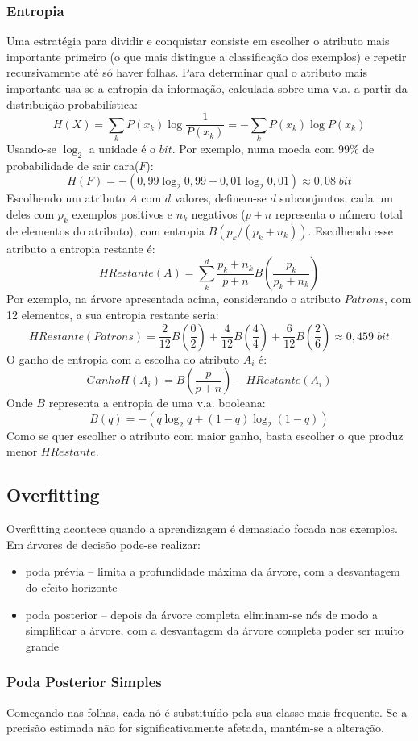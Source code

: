 \documentclass[10pt,a4paper]{report}
\begin{document}
\subsubsection{Entropia}
Uma estratégia para dividir e conquistar consiste em escolher o atributo mais importante primeiro (o que mais distingue a classificação dos exemplos) e repetir recursivamente até só haver folhas. Para determinar qual o atributo mais importante usa-se a entropia da informação, calculada sobre uma v.a. a partir da distribuição probabilística:
$$
H(X) = \sum_k P(x_k) \log \frac{1}{P(x_k)} = -\sum_k P(x_k) \log P(x_k)
$$
Usando-se $\log_2$ a unidade é o $bit$. Por exemplo, numa moeda com 99\% de probabilidade de sair cara($F$):
$$
H(F) = -(0,99\log_2 0,99 + 0,01 \log_2 0,01) \approx 0,08 \; bit
$$
Escolhendo um atributo $A$ com $d$ valores, definem-se $d$ subconjuntos, cada um deles com $p_k$ exemplos positivos e $n_k$ negativos ($p+n$ representa o número total de elementos do atributo), com entropia $B(p_k/(p_k+n_k))$. Escolhendo esse atributo a entropia restante é:
$$
HRestante(A) = \sum_k^d \frac{p_k + n_k}{p + n}B\left(\frac{p_k}{p_k+n_k}\right)
$$
Por exemplo, na árvore apresentada acima, considerando o atributo $Patrons$, com 12 elementos, a sua entropia restante seria:
$$
HRestante (Patrons) = \frac{2}{12} B\left(\frac{0}{2}\right) + \frac{4}{12} B\left(\frac{4}{4}\right) + \frac{6}{12} B\left(\frac{2}{6}\right) \approx 0,459 \; bit
$$
O ganho de entropia com a escolha do atributo $A_i$ é:
$$
GanhoH(A_i) = B \left(\frac{p}{p + n}\right) - HRestante(A_i)
$$
Onde $B$ representa a entropia de uma v.a. booleana: 
$$
B(q) = -(q\log_2 q+(1-q)\log_2 (1-q))
$$
Como se quer escolher o atributo com maior ganho, basta escolher o que produz menor $HRestante$.
\subsection{Overfitting}
Overfitting acontece quando a aprendizagem é demasiado focada nos exemplos. Em árvores de decisão pode-se realizar:
\begin{itemize}
\item poda prévia – limita a profundidade máxima da árvore, com a desvantagem do efeito horizonte
\item poda posterior – depois da árvore completa eliminam-se nós de modo a simplificar a árvore, com a desvantagem da árvore completa poder ser muito grande
\end{itemize}
\subsubsection{Poda Posterior Simples}
Começando nas folhas, cada nó é substituído pela sua classe mais frequente. Se a precisão estimada não for significativamente afetada, mantém-se a alteração.
\end{document}
